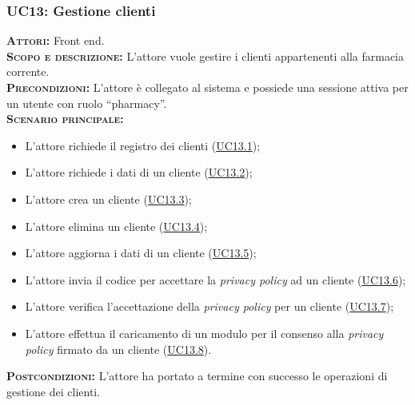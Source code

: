 \subsubsection{UC13: Gestione clienti}
\label{sec:UC13}
\textsc{\textbf{Attori:}} Front end.\\
\textsc{\textbf{Scopo e descrizione:}} L'attore vuole gestire i clienti appartenenti alla farmacia corrente.\\
\textsc{\textsc{\textbf{Precondizioni:}}} L'attore è collegato al sistema e possiede una sessione attiva per un utente con ruolo ``pharmacy''.\\
\textsc{\textbf{Scenario principale:}}
\begin{itemize}
    \item L'attore richiede il registro dei clienti (\hyperref[sec:UC131]{UC13.1});
    \item L'attore richiede i dati di un cliente (\hyperref[sec:UC132]{UC13.2});
    \item L'attore crea un cliente (\hyperref[sec:UC133]{UC13.3});
    \item L'attore elimina un cliente (\hyperref[sec:UC134]{UC13.4});
    \item L'attore aggiorna i dati di un cliente (\hyperref[sec:UC135]{UC13.5});
    \item L'attore invia il codice per accettare la \textit{privacy policy} ad un cliente (\hyperref[sec:UC136]{UC13.6});
    \item L'attore verifica l'accettazione della \textit{privacy policy} per un cliente (\hyperref[sec:UC137]{UC13.7});
    \item L'attore effettua il caricamento di un modulo per il consenso alla \textit{privacy policy} firmato da un cliente (\hyperref[sec:UC138]{UC13.8}).
\end{itemize}
\textsc{\textbf{Postcondizioni:}} L'attore ha portato a termine con successo le operazioni di gestione dei clienti.

